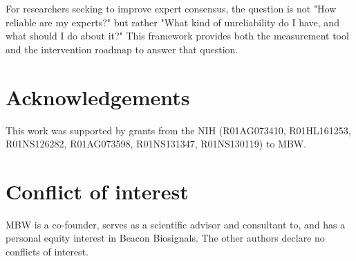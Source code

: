 \documentclass[num-refs]{wiley-article}
\begin{document}
For researchers seeking to improve expert consensus, the question is not "How reliable are my experts?" but rather "What kind of unreliability do I have, and what should I do about it?" This framework provides both the measurement tool and the intervention roadmap to answer that question.

\section*{Acknowledgements}\label{acknowledgements}

This work was supported by grants from the NIH (R01AG073410, R01HL161253, R01NS126282, R01AG073598, R01NS131347, R01NS130119) to MBW.

\section*{Conflict of interest}

{\label{644442}}

MBW is a co-founder, serves as a scientific advisor and consultant to, and has a personal equity interest in Beacon Biosignals. The other authors declare no conflicts of interest.

\FloatBarrier


\end{document}
